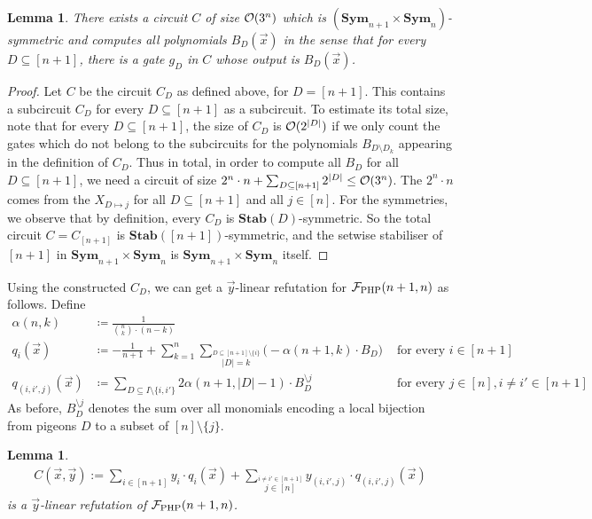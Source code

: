 \documentclass[10pt,a4paper]{article}
\newtheorem{lemma}[theorem]{Lemma}
\newcommand{\Sym}{{\mathbf{Sym}}}
\newcommand{\Ff}{{\cal F}}
\newcommand{\Oo}{{\cal O}}
\newcommand{\Stab}{\mathbf{Stab}}
\newcommand{\PHP}{\Ff_{\mathrm{PHP}}}
\begin{document}
\begin{lemma}
	\label{lem:computingAllBijections}
	There exists a circuit $C$ of size $\Oo(3^n)$ which is $(\Sym_{n+1} \times \Sym_{n})$-symmetric and computes all polynomials $B_D(\vec x)$ in the sense that for every $D \subseteq [n+1]$, there is a gate $g_D$ in $C$ whose output is $B_D(\vec x)$.
\end{lemma}	
\begin{proof}
	Let $C$ be the circuit $C_D$ as defined above, for $D = [n+1]$. This contains a subcircuit $C_D$ for every $D \subseteq [n+1]$ as a subcircuit. To estimate its total size, note that for every $D \subseteq [n+1]$, the size of $C_D$ is $\Oo(2^{|D|})$ if we only count the gates which do not belong to the subcircuits for the polynomials $B_{D \setminus D_k}$ appearing in the definition of $C_D$. Thus in total, in order to compute all $B_D$ for all $D \subseteq [n+1]$, we need a circuit of size $2^n \cdot n + \sum_{D \subseteq [n+1]} 2^{|D|} \leq \Oo(3^n)$. The $2^n \cdot n$ comes from the $X_{D \mapsto j}$ for all $D \subseteq [n+1]$ and all $j \in [n]$.
	For the symmetries, we observe that by definition, every $C_D$ is $\Stab(D)$-symmetric. So the total circuit $C = C_{[n+1]}$ is $\Stab([n+1])$-symmetric, and the setwise stabiliser of $[n+1]$ in $\Sym_{n+1} \times \Sym_{n}$ is $\Sym_{n+1} \times \Sym_{n}$ itself.
\end{proof}	
\noindent
Using the constructed $C_D$, we can get a $\vec y$-linear refutation for $\PHP(n+1,n)$ as follows. Define
\begin{align*}
	\alpha(n,k) &\coloneqq  \frac{1}{\binom{n}{k} \cdot (n-k)}\\	
	q_i(\vec x) &\coloneqq -\frac{1}{n+1} +  \sum_{k=1}^n \sum_{\stackrel{D \subseteq [n+1] \setminus \{i\}}{|D| = k}} \Big(- \alpha(n+1,k) \cdot B_D \Big) &\text{ for every } i \in [n+1] \\
	q_{(i,i',j)}(\vec x) &\coloneqq \sum_{D \subseteq I \setminus \{i,i'\}} 2 \alpha(n+1,|D|-1) \cdot B^{\setminus j}_{D} &\text{ for every } j \in [n], i \neq i' \in [n+1]
\end{align*}
As before, $B^{\setminus j}_D$ denotes the sum over all monomials encoding a local bijection from pigeons $D$ to a subset of $[n] \setminus \{j\}$. 
\begin{lemma}
	\begin{align*}
		C(\vec x, \vec y) := \sum_{i \in [n+1]} y_i \cdot q_i(\vec x) + \sum_{\stackrel{i \neq i' \in [n+1]}{j \in [n]}} y_{(i,i',j)} \cdot q_{(i,i',j)}(\vec x)
	\end{align*}	
	is a $\vec y$-linear refutation of $\PHP(n+1,n)$.
\end{lemma}	
\end{document}

